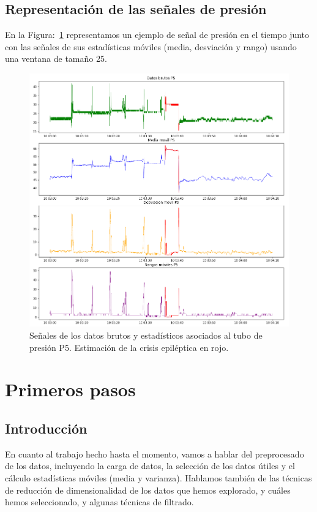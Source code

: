 \documentclass[a4paper,12pt,twoside,oldfontcommands]{memoir}
\begin{document}
\section{Representación de las señales de presión}
En la Figura:~\ref{fig:senalP5} representamos un ejemplo de señal de presión en el tiempo junto con las señales de sus estadísticas móviles (media, desviación y rango) usando una ventana de tamaño 25. 
\begin{figure}
    \centering
    \includegraphics[width=1\textwidth]{images/SenalP5.png}
    \caption{Señales de los datos brutos y estadísticos asociados al tubo de presión P5. Estimación de la crisis epiléptica en rojo.}
    \label{fig:senalP5}
\end{figure}

\chapter{Primeros pasos}
\section{Introducción}
En cuanto al trabajo hecho hasta el momento, vamos a hablar del preprocesado de los datos, incluyendo la carga de datos, la selección de los datos útiles y el cálculo estadísticas móviles (media y varianza). Hablamos también de las técnicas de reducción de dimensionalidad de los datos que hemos explorado, y cuáles hemos seleccionado, y algunas técnicas de filtrado. 
\end{document}
